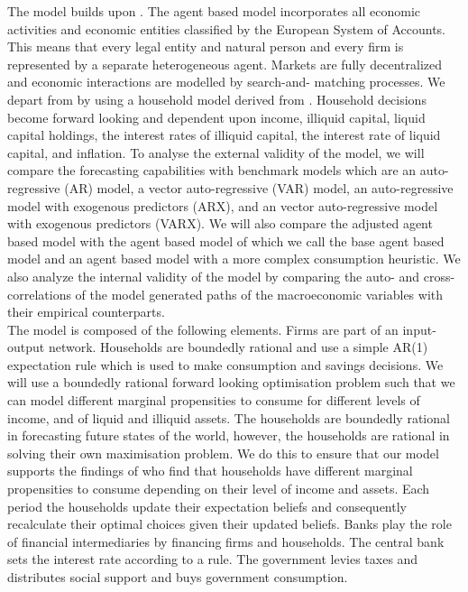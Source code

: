 \noindent The model builds upon \cite{poledna_economic_2019}. The agent based model incorporates all economic activities and economic entities classified by the European System of Accounts. This means that every legal entity and natural person and every firm is represented by a separate heterogeneous agent. Markets are fully decentralized and economic interactions are modelled by search-and- matching processes. We depart from \cite{poledna_economic_2019} by using a household model derived from \cite{kaplan_monetary_2018}. Household decisions become forward looking and dependent upon income, illiquid capital, liquid capital holdings, the interest rates of illiquid capital, the interest rate of liquid capital, and inflation. To analyse the external validity of the model, we will compare the forecasting capabilities with benchmark models which are an auto-regressive (AR) model, a vector auto-regressive (VAR) model, an auto-regressive model with exogenous predictors (ARX), and an vector auto-regressive model with exogenous predictors (VARX). We will also compare the adjusted agent based model with the agent based model of \cite{poledna_economic_2019} which we call the base agent based model and an agent based model with a more complex consumption heuristic. We also analyze the internal validity of the model by comparing the auto- and cross-correlations of the model generated paths of the macroeconomic variables with their empirical counterparts. \\

\noindent The model is composed of the following elements. Firms are part of an input-output network. Households are boundedly rational and use a simple AR(1) expectation rule which is used to make consumption and savings decisions. We will use a boundedly rational forward looking optimisation problem such that we can model different marginal propensities to consume for different levels of income, and of liquid and illiquid assets. The households are boundedly rational in forecasting future states of the world, however, the households are rational in solving their own maximisation problem. We do this to ensure that our model supports the findings of \cite{fagereng_mpc_2021} who find that households have different marginal propensities to consume depending on their level of income and assets. Each period the households update their expectation beliefs and consequently recalculate their optimal choices given their updated beliefs. Banks play the role of financial intermediaries by financing firms and households. The central bank sets the interest rate according to a \cite{taylor_discretion_1993} rule. The government levies taxes and distributes social support and buys government consumption. \\

